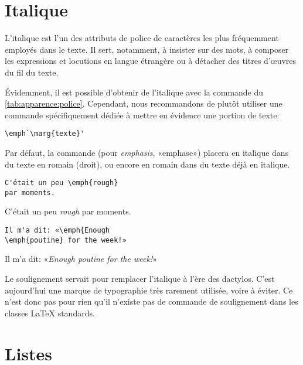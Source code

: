 \section{Italique}

L'italique est l'un des attributs de police de caractères les plus
fréquemment employés dans le texte. Il sert, notamment, à insister sur
des mots, à composer les expressions et locutions en langue étrangère
ou à détacher des titres d'{\oe}uvres du fil du texte.

Évidemment, il est possible d'obtenir de l'italique avec la commande
\cmd{\textit} du \autoref{tab:apparence:police}. Cependant, nous
recommandons de plutôt utiliser une commande spécifiquement dédiée à
mettre en évidence une portion de texte:
\begin{lstlisting}
\emph`\marg{texte}'
\end{lstlisting}
Par défaut, la commande \cmd{\emph} (pour \emph{emphasis}, «emphase»)
placera  en italique dans du texte en romain (droit), ou
encore en romain dans du texte déjà en italique.
\begin{demo}
  \begin{texample}
\begin{lstlisting}
C'était un peu \emph{rough}
par moments.
\end{lstlisting}
    \producing
    C'était un peu \emph{rough} par moments.
  \end{texample}
  \begin{texample}
\begin{lstlisting}
Il m'a dit: «\emph{Enough
\emph{poutine} for the week!»
\end{lstlisting}
    \producing
    Il m'a dit: «\emph{Enough \emph{poutine} for the week!}»
  \end{texample}
\end{demo}

\begin{conseil}
  Le soulignement servait pour remplacer
  l'italique à l'ère des dactylos. C'est aujourd'hui une marque de
  typographie très rarement utilisée, voire à éviter. Ce n'est donc
  pas pour rien qu'il n'existe pas de commande de soulignement dans
  les classes {\LaTeX} standards.
\end{conseil}


\section{Listes}
\label{sec:apparence:listes}

